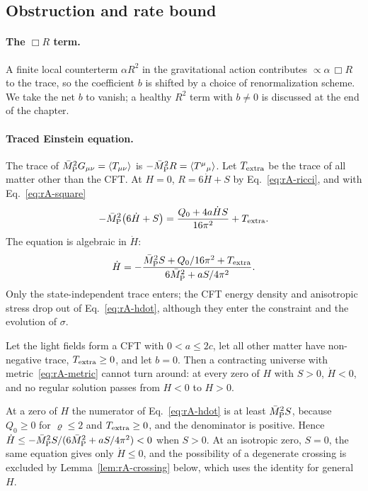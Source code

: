 \subsection{Obstruction and rate bound}
\label{rA:obstruction}

\paragraph{The $\Box R$ term.}
A finite local counterterm $\alpha R^2$ in the gravitational action contributes $\propto\alpha\,\Box R$ to the trace, so the coefficient $b$ is shifted by a choice of renormalization scheme.
We take the net $b$ to vanish; a healthy $R^2$ term with $b\neq0$ is discussed at the end of the chapter.

\paragraph{Traced Einstein equation.}
The trace of $\bar M_{\mathrm{P}}^2G_{\mu\nu}=\langle T_{\mu\nu}\rangle$ is $-\bar M_{\mathrm{P}}^2R=\langle T^\mu{}_\mu\rangle$.
Let $T_{\rm extra}$ be the trace of all matter other than the CFT.
At $H=0$, $R=6\dot H+S$ by Eq.~\eqref{eq:rA-ricci}, and with Eq.~\eqref{eq:rA-square}
\begin{equation}
-\bar M_{\mathrm{P}}^2\big(6\dot H+S\big)=\frac{Q_0+4a\dot HS}{16\pi^2}+T_{\rm extra}.
\end{equation}
The equation is algebraic in $\dot H$:
\begin{equation}
\dot H=-\frac{\bar M_{\mathrm{P}}^2S+Q_0/16\pi^2+T_{\rm extra}}{6\bar M_{\mathrm{P}}^2+aS/4\pi^2}.
\label{eq:rA-hdot}
\end{equation}
Only the state-independent trace enters; the CFT energy density and anisotropic stress drop out of Eq.~\eqref{eq:rA-hdot}, although they enter the constraint and the evolution of $\sigma$.

\begin{rAtheorem}[Obstruction]\label{thm:rA-obstruction}
Let the light fields form a CFT with $0<a\leq2c$, let all other matter have non-negative trace, $T_{\rm extra}\geq0$, and let $b=0$.
Then a contracting universe with metric~\eqref{eq:rA-metric} cannot turn around: at every zero of $H$ with $S>0$, $\dot H<0$, and no regular solution passes from $H<0$ to $H>0$.
\end{rAtheorem}

\begin{rAproof}
At a zero of $H$ the numerator of Eq.~\eqref{eq:rA-hdot} is at least $\bar M_{\mathrm{P}}^2S$, because $Q_0\geq0$ for $\varrho\leq2$ and $T_{\rm extra}\geq0$, and the denominator is positive.
Hence $\dot H\leq-\bar M_{\mathrm{P}}^2S/(6\bar M_{\mathrm{P}}^2+aS/4\pi^2)<0$ when $S>0$.
At an isotropic zero, $S=0$, the same equation gives only $\dot H\leq0$, and the possibility of a degenerate crossing is excluded by Lemma~\ref{lem:rA-crossing} below, which uses the identity for general $H$.
\end{rAproof}

